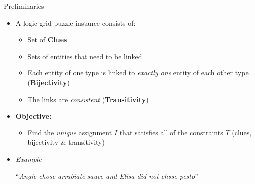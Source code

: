 \documentclass{beamer}
\begin{document}
\begin{frame}{Preliminaries}
    \begin{itemize}
        \item A logic grid puzzle instance consists of:
              \begin{itemize}
                \item Set of \textbf{Clues}
                  \item Sets of entities that need to be linked
                  \item Each entity of one type is linked to \textit{exactly one} entity of each other type (\textbf{Bijectivity})
                  \item The links are \textit{consistent} (\textbf{Transitivity})
              \end{itemize}\pause
        \item  \textbf{Objective:}
              \begin{itemize}\small
                  \item Find the \textit{unique} assignment $I$ that satisfies all of the constraints $T$ (clues, bijectivity \& transitivity)
              \end{itemize}\pause
        \item \textit{Example}
              \begin{center}
                  \small``\textit{Angie chose arrabiate sauce and Elisa did not chose pesto}'' \\
              \end{center}
    \end{itemize}\pause

\end{frame}
\end{document}
